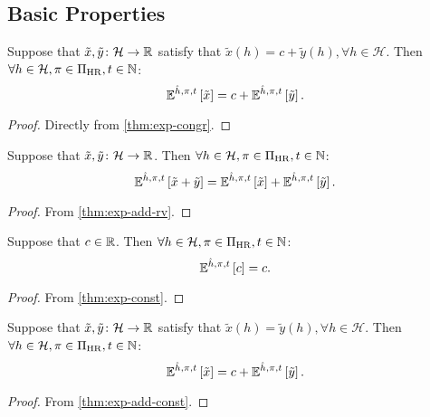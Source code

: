 \subsection{Basic Properties}


\begin{theorem} \label{thm:exph-congr}
Suppose that $\tilde{x}, \tilde{y} \colon \mathcal{H} \to \mathbb{R} $ satisfy that $\tilde{x}(h) = c + \tilde{y}(h), \forall h \in \mathcal{H}$. Then $\forall h\in \mathcal{H}, \pi\in \Pi_{\mathrm{HR}}, t \in \mathbb{N}$:
\[
  \mathbb{E}^{\hat{h}, \pi, t} \left[ \tilde{x} \right]
  =
  c + \mathbb{E}^{\hat{h}, \pi, t} \left[ \tilde{y} \right].
\]
 \leanok
\end{theorem}
\begin{proof}
Directly from \cref{thm:exp-congr}. 
\end{proof}

\begin{theorem} \label{thm:exph-add-rv}
Suppose that $\tilde{x}, \tilde{y} \colon \mathcal{H} \to \mathbb{R} $. Then $\forall h\in \mathcal{H}, \pi\in \Pi_{\mathrm{HR}}, t \in \mathbb{N}$:
\[
  \mathbb{E}^{\hat{h}, \pi, t} \left[ \tilde{x} + \tilde{y} \right]
  =
  \mathbb{E}^{\hat{h}, \pi, t} \left[ \tilde{x} \right] + \mathbb{E}^{\hat{h}, \pi, t} \left[ \tilde{y} \right].
\]
\end{theorem}
\begin{proof}
  From \cref{thm:exp-add-rv}.
\end{proof}

\begin{theorem} \label{thm:exph-const}
Suppose that $c\in \mathbb{R}$. Then $\forall h\in \mathcal{H}, \pi\in \Pi_{\mathrm{HR}}, t \in \mathbb{N}$:
\[
  \mathbb{E}^{\hat{h}, \pi, t} \left[ c \right] = c.
\]
\end{theorem}
\begin{proof}
  From \cref{thm:exp-const}.
\end{proof}

\begin{theorem} \label{thm:exph-add-const}
Suppose that $\tilde{x}, \tilde{y} \colon \mathcal{H} \to \mathbb{R} $ satisfy that $\tilde{x}(h) = \tilde{y}(h), \forall h \in \mathcal{H}$. Then $\forall h\in \mathcal{H}, \pi\in \Pi_{\mathrm{HR}}, t \in \mathbb{N}$:
\[
  \mathbb{E}^{\hat{h}, \pi, t} \left[ \tilde{x} \right]
  =
  c + \mathbb{E}^{\hat{h}, \pi, t} \left[ \tilde{y} \right].
\]
\end{theorem}
\begin{proof}
From \cref{thm:exp-add-const}.
\end{proof}


